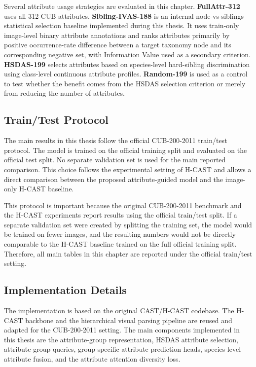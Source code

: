 Several attribute usage strategies are evaluated in this chapter. \textbf{FullAttr-312} uses all 312 CUB attributes. \textbf{Sibling-IVAS-188} is an internal node-vs-siblings statistical selection baseline implemented during this thesis. It uses train-only image-level binary attribute annotations and ranks attributes primarily by positive occurrence-rate difference between a target taxonomy node and its corresponding negative set, with Information Value used as a secondary criterion. \textbf{HSDAS-199} selects attributes based on species-level hard-sibling discrimination using class-level continuous attribute profiles. \textbf{Random-199} is used as a control to test whether the benefit comes from the HSDAS selection criterion or merely from reducing the number of attributes.


\subsection{Train/Test Protocol}

The main results in this thesis follow the official CUB-200-2011 train/test protocol. The model is trained on the official training split and evaluated on the official test split. No separate validation set is used for the main reported comparison. This choice follows the experimental setting of H-CAST and allows a direct comparison between the proposed attribute-guided model and the image-only H-CAST baseline.

This protocol is important because the original CUB-200-2011 benchmark and the H-CAST experiments report results using the official train/test split. If a separate validation set were created by splitting the training set, the model would be trained on fewer images, and the resulting numbers would not be directly comparable to the H-CAST baseline trained on the full official training split. Therefore, all main tables in this chapter are reported under the official train/test setting.



\subsection{Implementation Details}

The implementation is based on the original CAST/H-CAST codebase. The H-CAST backbone and the hierarchical visual parsing pipeline are reused and adapted for the CUB-200-2011 setting. The main components implemented in this thesis are the attribute-group representation, HSDAS attribute selection, attribute-group queries, group-specific attribute prediction heads, species-level attribute fusion, and the attribute attention diversity loss.

